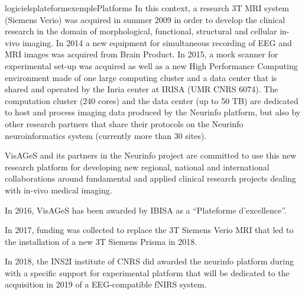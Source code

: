 \documentclass{ra2018}
\begin{document}
\begin{module}{logiciels}{plateformexemple}{Platforms}
In this context, a research 3T MRI system (Siemens Verio) was acquired in summer 2009 in order to develop the clinical research in the domain of morphological, functional, structural and cellular in-vivo imaging. In 2014 a new equipment for simultaneous recording of EEG and MRI images was acquired from Brain Product. In 2015, a mock scanner for experimental set-up was acquired as well as a new High Performance Computing environment made of one large computing cluster and a data center that is shared and operated by the Inria center at IRISA (UMR CNRS 6074). The computation cluster (240 cores) and the data center (up to 50 TB) are dedicated to host and process imaging data produced by the Neurinfo platform, but also by other research partners that share their protocols on the Neurinfo neuroinformatics system (currently more than 30 sites).

VisAGeS and its partners in the Neurinfo project are committed to use this new research platform for developing new regional, national and international collaborations around fundamental and applied clinical research projects dealing with in-vivo medical imaging.

In 2016, VisAGeS has been awarded by IBISA as a “Plateforme d'excellence”.

In 2017, funding was collected to replace the 3T Siemens Verio MRI that led to the installation of a new 3T Siemens Prisma in 2018.

In 2018, the INS2I institute of CNRS did awarded the neurinfo platform during with a specific support for experimental platform that will be dedicated to the acquisition in 2019 of a EEG-compatible fNIRS system.

 \end{module}



\end{document}
